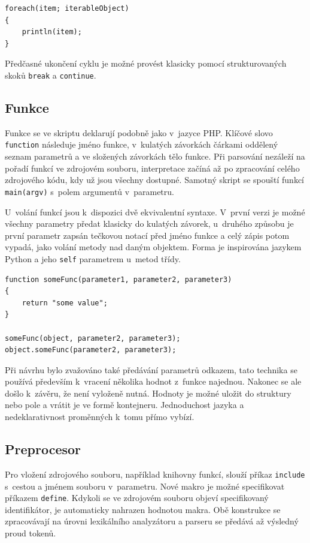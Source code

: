 \documentclass[11pt,twoside,a4paper]{book}
\begin{document}
\begin{verbatim}
foreach(item; iterableObject)
{
    println(item);
}
\end{verbatim}

Předčasné ukončení cyklu je možné provést klasicky pomocí strukturovaných skoků \texttt{break} a \texttt{continue}.


\subsection{Funkce}

Funkce se ve skriptu deklarují podobně jako v~jazyce PHP. Klíčové slovo \texttt{function} následuje jméno funkce, v~kulatých závorkách čárkami oddělený seznam parametrů a ve složených závorkách tělo funkce. Při parsování nezáleží na pořadí funkcí ve zdrojovém souboru, interpretace začíná až po zpracování celého zdrojového kódu, kdy už jsou všechny dostupné. Samotný skript se spouští funkcí \texttt{main(argv)} s~polem argumentů v~parametru.

U~volání funkcí jsou k~dispozici dvě ekvivalentní syntaxe. V~první verzi je možné všechny parametry předat klasicky do kulatých závorek, u~druhého způsobu je první parametr zapsán tečkovou notací před jméno funkce a celý zápis potom vypadá, jako volání metody nad daným objektem. Forma je inspirována jazykem Python a jeho \texttt{self} parametrem u~metod třídy.

\begin{verbatim}
function someFunc(parameter1, parameter2, parameter3)
{
    return "some value";
}

someFunc(object, parameter2, parameter3);
object.someFunc(parameter2, parameter3);
\end{verbatim}

Při návrhu bylo zvažováno také předávání parametrů odkazem, tato technika se používá především k~vracení několika hodnot z~funkce najednou. Nakonec se ale došlo k~závěru, že není vyloženě nutná. Hodnoty je možné uložit do struktury nebo pole a vrátit je ve formě kontejneru. Jednoduchost jazyka a nedeklarativnost proměnných k~tomu přímo vybízí.


\subsection{Preprocesor}
\label{preprocesor}

Pro vložení zdrojového souboru, například knihovny funkcí, slouží příkaz \texttt{include} s~cestou a jménem souboru v~parametru. Nové makro je možné specifikovat příkazem \texttt{define}. Kdykoli se ve zdrojovém souboru objeví specifikovaný identifikátor, je automaticky nahrazen hodnotou makra. Obě konstrukce se zpracovávají na úrovni lexikálního analyzátoru a parseru se předává až výsledný proud tokenů.
\end{document}

